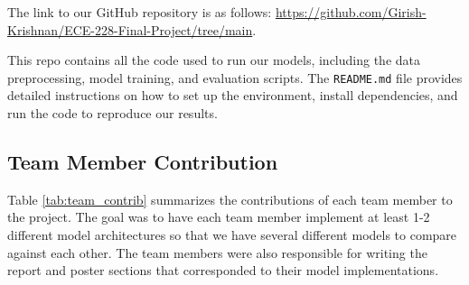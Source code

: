 \documentclass{article}
\newcommand{\instructions}[1]{{\color{blue} #1}}
\begin{document}
The link to our GitHub repository is as follows: \url{https://github.com/Girish-Krishnan/ECE-228-Final-Project/tree/main}. 

This repo contains all the code used to run our models, including the data preprocessing, model training, and evaluation scripts. The \texttt{README.md} file provides detailed instructions on how to set up the environment, install dependencies, and run the code to reproduce our results.

\subsection*{Team Member Contribution}
Table \ref{tab:team_contrib} summarizes the contributions of each team member to the project. The goal was to have each team member implement at least 1-2 different model architectures so that we have several different models to compare against each other. The team members were also responsible for writing the report and poster sections that corresponded to their model implementations.
\end{document}

